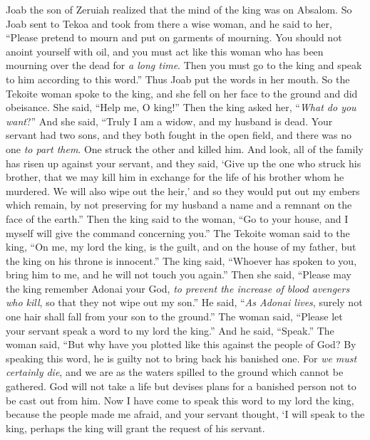 \begin{biblechapter} %
 Joab the son of Zeruiah realized that the mind of the king was on Absalom.
\verse So Joab sent to Tekoa and took from there a wise woman, and he said to her, “Please pretend to mourn and put on garments of mourning. You should not anoint yourself with oil, and you must act like this woman who has been mourning over the dead for \textit{a long time}.
\verse Then you must go to the king and speak to him according to this word.” Thus Joab put the words in her mouth.
\verse So the Tekoite woman spoke to the king, and she fell on her face to the ground and did obeisance. She said, “Help me, O king!”
\verse Then the king asked her, “\textit{What do you want}?” And she said, “Truly I am a widow, and my husband is dead.
\verse Your servant had two sons, and they both fought in the open field, and there was no one \textit{to part them}. One struck the other and killed him.
\verse And look, all of the family has risen up against your servant, and they said, ‘Give up the one who struck his brother, that we may kill him in exchange for the life of his brother whom he murdered. We will also wipe out the heir,’ and so they would put out my embers which remain, by not preserving for my husband a name and a remnant on the face of the earth.”
\verse Then the king said to the woman, “Go to your house, and I myself will give the command concerning you.”
\verse The Tekoite woman said to the king, “On me, my lord the king, is the guilt, and on the house of my father, but the king on his throne is innocent.”
\verse The king said, “Whoever has spoken to you, bring him to me, and he will not touch you again.”
\verse Then she said, “Please may the king remember Adonai your God, \textit{to prevent the increase of blood avengers who kill}, so that they not wipe out my son.” He said, “\textit{As Adonai lives}, surely not one hair shall fall from your son to the ground.”
\verse The woman said, “Please let your servant speak a word to my lord the king.” And he said, “Speak.”
\verse The woman said, “But why have you plotted like this against the people of God? By speaking this word, he is guilty not to bring back his banished one.
\verse For \textit{we must certainly die}, and we are as the waters spilled to the ground which cannot be gathered. God will not take a life but devises plans for a banished person not to be cast out from him.
\verse Now I have come to speak this word to my lord the king, because the people made me afraid, and your servant thought, ‘I will speak to the king, perhaps the king will grant the request of his servant.

\end{biblechapter}
